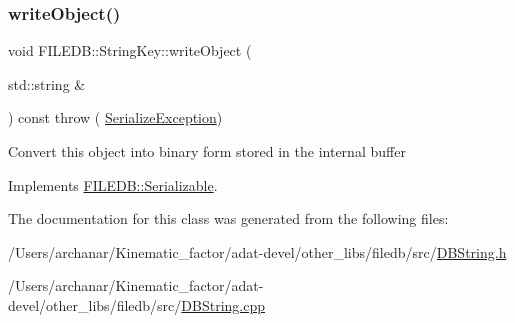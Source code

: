 \subsubsection{\texorpdfstring{writeObject()}{writeObject()}\hspace{0.1cm}{\footnotesize\ttfamily [3/3]}}
{\footnotesize\ttfamily void F\+I\+L\+E\+D\+B\+::\+String\+Key\+::write\+Object (\begin{DoxyParamCaption}\item[{std\+::string \&}]{ }\end{DoxyParamCaption}) const throw ( \mbox{\hyperlink{classFILEDB_1_1SerializeException}{Serialize\+Exception}}) \hspace{0.3cm}{\ttfamily [virtual]}}

Convert this object into binary form stored in the internal buffer 

Implements \mbox{\hyperlink{classFILEDB_1_1Serializable_a8deaa86e108c08c863881e46cf5578ea}{F\+I\+L\+E\+D\+B\+::\+Serializable}}.



The documentation for this class was generated from the following files\+:\begin{DoxyCompactItemize}
\item 
/\+Users/archanar/\+Kinematic\+\_\+factor/adat-\/devel/other\+\_\+libs/filedb/src/\mbox{\hyperlink{adat-devel_2other__libs_2filedb_2src_2DBString_8h}{D\+B\+String.\+h}}\item 
/\+Users/archanar/\+Kinematic\+\_\+factor/adat-\/devel/other\+\_\+libs/filedb/src/\mbox{\hyperlink{adat-devel_2other__libs_2filedb_2src_2DBString_8cpp}{D\+B\+String.\+cpp}}\end{DoxyCompactItemize}

